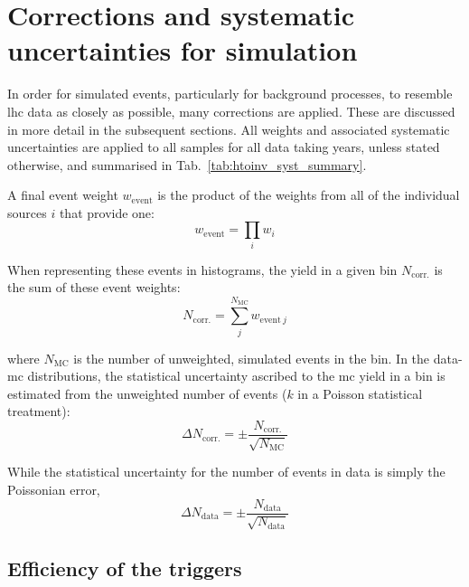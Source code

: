 \section{Corrections and systematic uncertainties for simulation}
\label{sec:htoinv_mc_corrections}

In order for simulated events, particularly for background processes, to resemble \acrshort{lhc} data as closely as possible, many corrections are applied. These are discussed in more detail in the subsequent sections. All weights and associated systematic uncertainties are applied to all samples for all data taking years, unless stated otherwise, and summarised in Tab.~\ref{tab:htoinv_syst_summary}.

A final event weight $w_{\mathrm{event}}$ is the product of the weights from all of the individual sources $i$ that provide one:
\begin{equation}
    w_{\mathrm{event}} = \prod_i w_i
    \label{eq:event_weight}
\end{equation}

When representing these events in histograms, the yield in a given bin $N_{\mathrm{corr.}}$ is the sum of these event weights:
\begin{equation}
    N_{\mathrm{corr.}} = \sum_j^{N_{\mathrm{MC}}} w_{\mathrm{event} \ j}
    \label{eq:bin_weight}
\end{equation}

where $N_{\mathrm{MC}}$ is the number of unweighted, simulated events in the bin. In the data-\acrshort{mc} distributions, the statistical uncertainty ascribed to the \acrshort{mc} yield in a bin is estimated from the unweighted number of events ($k$ in a Poisson statistical treatment):
\begin{equation}
    \Delta N_{\mathrm{corr.}} = \pm \frac{ N_{\mathrm{corr.}} }{ \sqrt{N_{\mathrm{MC}}} }
    \label{eq:uncertainty_mc_ours}
\end{equation}

While the statistical uncertainty for the number of events in data is simply the Poissonian error,
\begin{equation}
    \Delta N_{\mathrm{data}} = \pm \frac{ N_{\mathrm{data}} }{ \sqrt{N_{\mathrm{data}}} }
    \label{eq:uncertainty_data}
\end{equation}




\subsection{Efficiency of the triggers}
\label{subsec:htoinv_trigger_effs}

